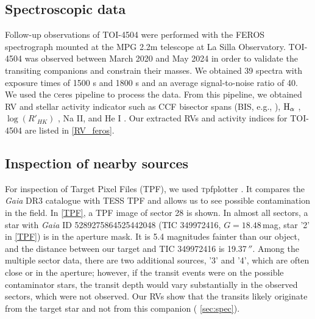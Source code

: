 \documentclass[twocolumn,twocolappendix]{aastex631}
\let\orgautoref\autoref
\renewcommand{\autoref}
        {\def\equationautorefname{Eq.}%
         \def\figureautorefname{Fig.}%
         \def\sectionautorefname{Sect.}%
         \def\subsectionautorefname{Sect.}%
         \def\subsubsectionautorefname{Sect.}%
         \orgautoref}
\begin{document}
\subsection{Spectroscopic data}
\label{sec:spec}
Follow-up observations of TOI-4504 were performed with the FEROS spectrograph \citep{feros} mounted at the MPG 2.2m telescope at La Silla Observatory. TOI-4504 was observed between March 2020 and May 2024 in order to validate the transiting companions and constrain their masses. We obtained 39 spectra with exposure times of 1500 s and 1800 s and an average signal-to-noise ratio of 40. We used the {\textsc ceres} pipeline \citep{ceres} to process the data. From this pipeline, we obtained RV and stellar activity indicator such as CCF bisector spans (BIS, e.g., \cite{bis}), $\rm{H}_{\alpha}$ \citep{haplha}, $\log(R'_{HK})$ \citep{log,log2}, Na II, and He I \citep{he}.
Our extracted RVs and activity indices for TOI-4504 are listed in \autoref{RV_feros}. 


\subsection{Inspection of nearby sources}
\label{sec:contaminant}
For inspection of Target Pixel Files (TPF), we used {\textsc tpfplotter} \citep{tpfplotter}. It compares the {\it Gaia} DR3 catalogue with TESS TPF and allows us to see possible contamination in the field. In \autoref{TPF}, a TPF image of sector 28 is shown. In almost all sectors, a star with {\it Gaia} ID 5289275864525442048 (TIC 349972416, $G=18.48$\,mag, star '2' in \autoref{TPF}) is in the aperture mask. It is 5.4 magnitudes fainter than our object, and the distance between our target and TIC 349972416 is 19.37\,$''$. Among the multiple sector data, there are two additional sources, '3' and '4', which are often close or in the aperture; however, if the transit events were on the possible contaminator stars, the transit depth would vary substantially in the observed sectors, which were not observed. Our RVs show that the transits likely originate from the target star and not from this companion (\autoref{sec:spec}).
\end{document}
